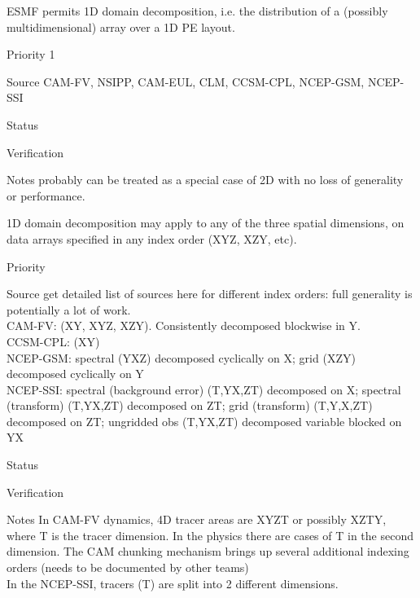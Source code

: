 ESMF permits 1D domain decomposition, i.e. the distribution of a
(possibly multidimensional) array over a 1D PE layout.

\begin{reqlist}
\item[Priority] 1
\item[Source] CAM-FV, NSIPP, CAM-EUL, CLM, CCSM-CPL, NCEP-GSM, NCEP-SSI \\
\item[Status]
\item[Verification]
\item[Notes] probably can be treated as a special case of 2D with no
  loss of generality or performance.
\end{reqlist}


1D domain decomposition may apply to any of the three spatial
dimensions, on data arrays specified in any index order (XYZ, XZY,
etc).

\begin{reqlist}
\item[Priority]
\item[Source] get detailed list of sources here for different index
  orders: full generality is potentially a lot of work. \\
 CAM-FV: (XY, XYZ, XZY).  Consistently decomposed blockwise in Y. \\
 CCSM-CPL: (XY) \\
 NCEP-GSM: spectral (YXZ) decomposed cyclically on X;
           grid (XZY) decomposed cyclically on Y \\
 NCEP-SSI: spectral (background error) (T,YX,ZT) decomposed on X;
           spectral (transform) (T,YX,ZT) decomposed on ZT;
           grid (transform) (T,Y,X,ZT) decomposed on ZT;
           ungridded obs (T,YX,ZT) decomposed variable blocked on YX \\
\item[Status]
\item[Verification]
\item[Notes]  In CAM-FV dynamics, 4D tracer areas are XYZT or
	possibly XZTY, where T is the tracer dimension.  In the physics
	there are cases of T in the second dimension.  The CAM
	chunking mechanism brings up several additional indexing
	orders (needs to be documented by other teams) \\
        In the NCEP-SSI, tracers (T) are split into 2 different dimensions. \\
\end{reqlist}

